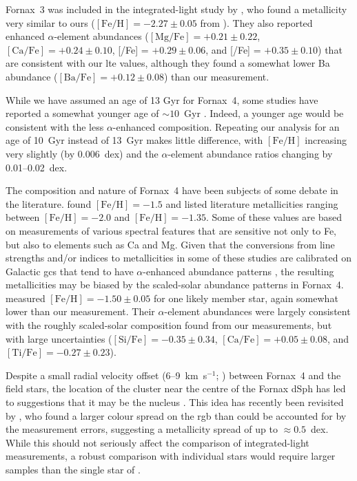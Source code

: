 \documentclass{aa}
\begin{document}
Fornax~3 was included in the integrated-light study by \citet{Colucci2017}, who found a metallicity very similar to ours ($\mathrm{[Fe/H]}=-2.27\pm0.05$ from ). They also reported enhanced $\alpha$-element abundances ($\mathrm{[Mg/Fe]} = +0.21\pm0.22$, $\mathrm{[Ca/Fe]} = +0.24\pm0.10$, [/Fe] = $+0.29\pm0.06$, and [/Fe] = $+0.35\pm0.10$) that are consistent with our \ac{lte} values, although they found a somewhat lower Ba abundance ($\mathrm{[Ba/Fe]} = +0.12\pm0.08$) than our measurement. 

While we have assumed an age of 13 Gyr for Fornax~4, some studies have reported a somewhat younger age of $\sim10$~Gyr \citep{Buonanno1999,Hendricks2016,Martocchia2020}. Indeed, a younger age would be consistent with the less $\alpha$-enhanced composition. 
Repeating our analysis for an age of 10~Gyr instead of 13~Gyr makes little difference, with $\mathrm{[Fe/H]}$ increasing very slightly (by 0.006~dex) and the $\alpha$-element abundance ratios changing by 0.01--0.02~dex. 

The composition and nature of Fornax~4 have been subjects of some debate in the literature. \citet{Strader2003} found $\mathrm{[Fe/H]}=-1.5$ and listed literature metallicities ranging between $\mathrm{[Fe/H]}=-2.0$ and $\mathrm{[Fe/H]}=-1.35$. Some of these values are based on measurements of various spectral features that are sensitive not only to Fe, but also to elements such as Ca and Mg. Given that the conversions from line strengths and/or indices to metallicities in some of these studies are calibrated on Galactic \acp{gc} that tend to have $\alpha$-enhanced abundance patterns \citep{Brodie1990,Dubath1992}, the resulting metallicities may be biased by the scaled-solar abundance patterns in Fornax~4. \citet{Hendricks2016} measured $\mathrm{[Fe/H]} = -1.50\pm0.05$ for one likely member star, again somewhat lower than our measurement. Their $\alpha$-element abundances were largely consistent with the roughly scaled-solar composition found from our measurements, but with large uncertainties ($\mathrm{[Si/Fe]} = -0.35\pm0.34$, $\mathrm{[Ca/Fe]} =+0.05\pm0.08$, and $\mathrm{[Ti/Fe]} = -0.27\pm0.23$).

Despite a small radial velocity offset 
(6--9~km~s$^{-1}$; \citealt{Larsen2012a,Hendricks2016})
between Fornax~4 and the field stars, the location of the cluster near the centre of the Fornax dSph has led to suggestions that it may be the nucleus \citep{Hardy2002,Strader2003}. This idea has recently been revisited by \citet{Martocchia2020}, who found a larger colour spread on the \ac{rgb} than could be accounted for by the measurement errors, suggesting a metallicity spread of up to $\approx0.5$~dex. While this should not seriously affect the comparison of integrated-light measurements, a robust comparison with individual stars would require larger samples than the single star of \citet{Hendricks2016}.
\end{document}

